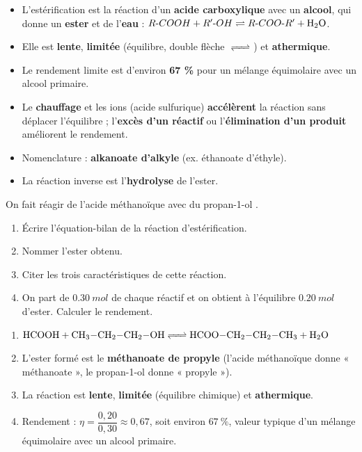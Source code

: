 \documentclass[11pt]{article}
\begin{document}
\begin{aretenir}
\begin{itemize}
\item L'estérification est la réaction d'un \textbf{acide carboxylique} avec un \textbf{alcool}, qui donne un \textbf{ester} et de l'\textbf{eau} : $R\text{-}COOH + R'\text{-}OH \rightleftharpoons R\text{-}COO\text{-}R' + \ce{H2O}$.
\item Elle est \textbf{lente}, \textbf{limitée} (équilibre, double flèche $\ce{<=>}$) et \textbf{athermique}.
\item Le rendement limite est d'environ \textbf{67 \%} pour un mélange équimolaire avec un alcool primaire.
\item Le \textbf{chauffage} et les ions  (acide sulfurique) \textbf{accélèrent} la réaction sans déplacer l'équilibre ; l'\textbf{excès d'un réactif} ou l'\textbf{élimination d'un produit} améliorent le rendement.
\item Nomenclature : \textbf{alkanoate d'alkyle} (ex. éthanoate d'éthyle).
\item La réaction inverse est l'\textbf{hydrolyse} de l'ester.
\end{itemize}
\end{aretenir}

\begin{exercice}
On fait réagir de l'acide méthanoïque  avec du propan-1-ol .
\begin{enumerate}
\item Écrire l'équation-bilan de la réaction d'estérification.
\item Nommer l'ester obtenu.
\item Citer les trois caractéristiques de cette réaction.
\item On part de $\SI{0,30}{mol}$ de chaque réactif et on obtient à l'équilibre $\SI{0,20}{mol}$ d'ester. Calculer le rendement.
\end{enumerate}
\end{exercice}

\begin{corrige}
\begin{enumerate}
\item $\ce{HCOOH + CH3-CH2-CH2-OH <=> HCOO-CH2-CH2-CH3 + H2O}$
\item L'ester formé est le \textbf{méthanoate de propyle} (l'acide méthanoïque donne « méthanoate », le propan-1-ol donne « propyle »).
\item La réaction est \textbf{lente}, \textbf{limitée} (équilibre chimique) et \textbf{athermique}.
\item Rendement : $\eta = \dfrac{0{,}20}{0{,}30} \approx 0{,}67$, soit environ $67\ \%$, valeur typique d'un mélange équimolaire avec un alcool primaire.
\end{enumerate}
\end{corrige}
\end{document}
